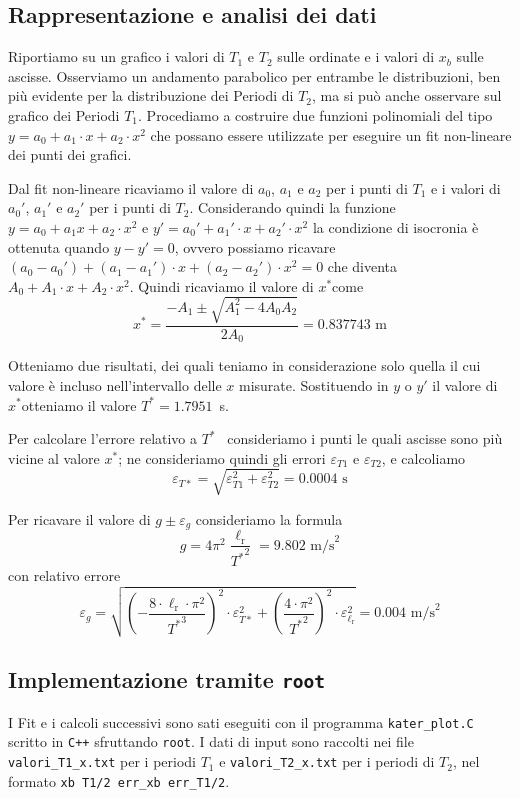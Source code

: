 \documentclass[italian, a4paper, 10pt, twocolumn]{../../style/lab_unige}
\newcommand{\stdErr}[1]{$\varepsilon_{#1}$}
\newcommand{\mstdErr}[1]{\varepsilon_{#1}}
\newcommand{\cernroot}{\texttt{root}}
\newcommand{\Tiso}{$T^*$}
\newcommand{\xiso}{$x^*$}
\begin{document}
    \subsection{Rappresentazione e analisi dei dati}
    Riportiamo su un grafico i valori di $T_1$ e $T_2$ sulle ordinate e i valori di $x_b$ sulle ascisse. Osserviamo un andamento parabolico per entrambe le distribuzioni, ben più evidente per la distribuzione dei Periodi di $T_2$, ma si può anche osservare sul grafico dei Periodi $T_1$. 
    Procediamo a costruire due funzioni polinomiali del tipo $y=a_0+a_1\cdot x+a_2\cdot x^2$ che possano essere utilizzate per eseguire un fit non-lineare dei punti dei grafici.

    Dal fit non-lineare ricaviamo il valore di $a_0$, $a_1$ e $a_2$ per i punti di $T_1$ e i valori di $a_0'$, $a_1'$ e $a_2'$ per i punti di $T_2$.
    Considerando quindi la funzione $y=a_0+a_1x+a_2\cdot x^2$ e $y'=a_0'+a_1'\cdot x+a_2'\cdot x^2$ la condizione di isocronia è ottenuta quando $y-y'=0$, ovvero possiamo ricavare $(a_0-a_0')+(a_1-a_1')\cdot x+(a_2-a_2')\cdot x^2=0$ che diventa $A_0+A_1\cdot x + A_2 \cdot x^2$. Quindi ricaviamo il valore di \xiso come
    \begin{equation}\label{eqn:xiso}
        x^* = \frac{-A_1\pm\sqrt{A_1^2-4 A_0 A_2}}{2A_0}=0.837743\text{ m}
    \end{equation}

    Otteniamo due risultati, dei quali teniamo in considerazione solo quella il cui valore è incluso nell'intervallo delle $x$ misurate.
    Sostituendo in $y$ o $y'$ il valore di \xiso otteniamo il valore \Tiso$=1.7951$~s.

    Per calcolare l'errore relativo a \Tiso~ consideriamo i punti le quali ascisse sono più vicine al valore \xiso; ne consideriamo quindi gli errori \stdErr{T1} e \stdErr{T2}, e calcoliamo \[\mstdErr{T*}=\sqrt{\mstdErr{T1}^2+\mstdErr{T2}^2}=0.0004\text{ s}\]

    Per ricavare il valore di $g\pm\mstdErr{g}$ consideriamo la formula
    \[
        g=4\pi^2\frac{\ell_{\text{r}}}{{T^*}^2}=9.802\text{ m/s}^2
    \]
    con relativo errore
    \[
        \mstdErr{g}=\sqrt{
            \left(
                -\frac{8\cdot \ell_{\text{r}}\cdot\pi^2}{{T^*}^3}
            \right)^2\cdot\mstdErr{T*}^2+
            \left(
                \frac{4\cdot\pi^2}{{T^*}^2}
            \right)^2\cdot\mstdErr{\ell_{\text{r}}}^2
        }=0.004\text{ m/s}^2
    \]

    \subsection{Implementazione tramite {\normalfont \cernroot}}
    I Fit e i calcoli successivi sono sati eseguiti con il programma \verb|kater_plot.C| scritto in \verb|C++| sfruttando \cernroot. I dati di input sono raccolti nei file \verb|valori_T1_x.txt| per i periodi $T_1$ e \verb|valori_T2_x.txt| per i periodi di $T_2$, nel formato \verb|xb T1/2 err_xb err_T1/2|.
\end{document}
